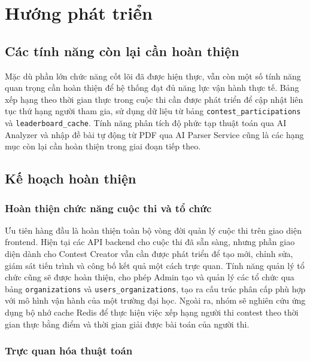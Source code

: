 \documentclass[12pt, a4paper]{report}
\begin{document}
\chapter{Hướng phát triển}

\section{Các tính năng còn lại cần hoàn thiện}

Mặc dù phần lớn chức năng cốt lõi đã được hiện thực, vẫn còn một số tính năng quan trọng cần hoàn thiện để hệ thống đạt đủ năng lực vận hành thực tế. Bảng xếp hạng theo thời gian thực trong cuộc thi cần được phát triển để cập nhật liên tục thứ hạng người tham gia, sử dụng dữ liệu từ bảng \texttt{contest\_participations} và \texttt{leaderboard\_cache}. Tính năng phân tích độ phức tạp thuật toán qua AI Analyzer và nhập đề bài tự động từ \ac{PDF} qua AI Parser Service cũng là các hạng mục còn lại cần hoàn thiện trong giai đoạn tiếp theo.

\section{Kế hoạch hoàn thiện}

\subsection{Hoàn thiện chức năng cuộc thi và tổ chức}

Ưu tiên hàng đầu là hoàn thiện toàn bộ vòng đời quản lý cuộc thi trên giao diện frontend. Hiện tại các \ac{API} backend cho cuộc thi đã sẵn sàng, nhưng phần giao diện dành cho Contest Creator vẫn cần được phát triển để tạo mới, chỉnh sửa, giám sát tiến trình và công bố kết quả một cách trực quan. Tính năng quản lý tổ chức cũng sẽ được hoàn thiện, cho phép Admin tạo và quản lý các tổ chức qua bảng \texttt{organizations} và \texttt{users\_organizations}, tạo ra cấu trúc phân cấp phù hợp với mô hình vận hành của một trường đại học. Ngoài ra, nhóm sẽ nghiên cứu ứng dụng bộ nhớ cache Redis để thực hiện việc xếp hạng người thi contest theo thời gian thực bằng điểm và thời gian giải được bài toán của người thi.

\subsection{Trực quan hóa thuật toán}
\end{document}
